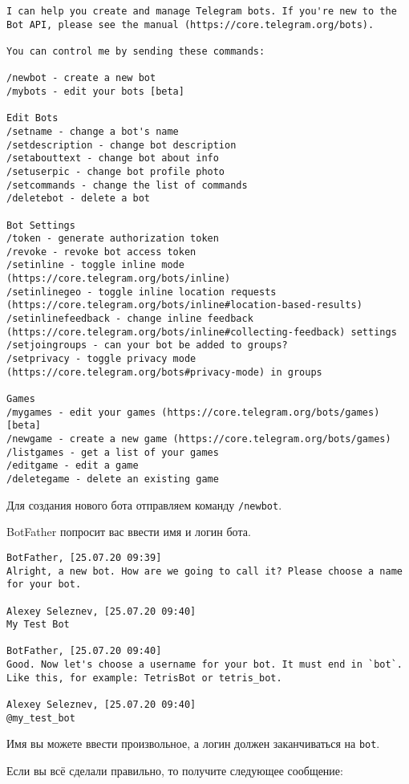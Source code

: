 \documentclass[
]{book}
\begin{document}
\begin{verbatim}
I can help you create and manage Telegram bots. If you're new to the Bot API, please see the manual (https://core.telegram.org/bots).

You can control me by sending these commands:

/newbot - create a new bot
/mybots - edit your bots [beta]

Edit Bots
/setname - change a bot's name
/setdescription - change bot description
/setabouttext - change bot about info
/setuserpic - change bot profile photo
/setcommands - change the list of commands
/deletebot - delete a bot

Bot Settings
/token - generate authorization token
/revoke - revoke bot access token
/setinline - toggle inline mode (https://core.telegram.org/bots/inline)
/setinlinegeo - toggle inline location requests (https://core.telegram.org/bots/inline#location-based-results)
/setinlinefeedback - change inline feedback (https://core.telegram.org/bots/inline#collecting-feedback) settings
/setjoingroups - can your bot be added to groups?
/setprivacy - toggle privacy mode (https://core.telegram.org/bots#privacy-mode) in groups

Games
/mygames - edit your games (https://core.telegram.org/bots/games) [beta]
/newgame - create a new game (https://core.telegram.org/bots/games)
/listgames - get a list of your games
/editgame - edit a game
/deletegame - delete an existing game
\end{verbatim}

Для создания нового бота отправляем команду \texttt{/newbot}.

BotFather попросит вас ввести имя и логин бота.

\begin{verbatim}
BotFather, [25.07.20 09:39]
Alright, a new bot. How are we going to call it? Please choose a name for your bot.

Alexey Seleznev, [25.07.20 09:40]
My Test Bot

BotFather, [25.07.20 09:40]
Good. Now let's choose a username for your bot. It must end in `bot`. Like this, for example: TetrisBot or tetris_bot.

Alexey Seleznev, [25.07.20 09:40]
@my_test_bot
\end{verbatim}

Имя вы можете ввести произвольное, а логин должен заканчиваться на \texttt{bot}.

Если вы всё сделали правильно, то получите следующее сообщение:
\end{document}
